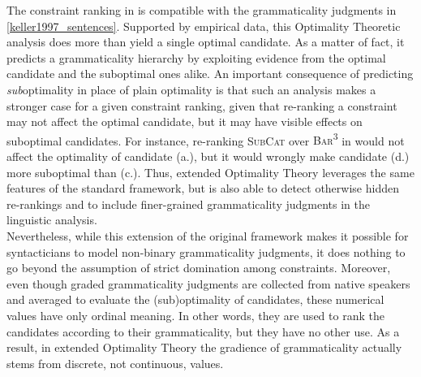 The constraint ranking in  is compatible with the grammaticality judgments in \ref{keller1997_sentences}. Supported by empirical data, this Optimality Theoretic analysis does more than yield a single optimal candidate. As a matter of fact, it predicts a grammaticality hierarchy by exploiting evidence from the optimal candidate and the suboptimal ones alike. An important consequence of predicting \textit{sub}optimality in place of plain optimality is that such an analysis makes a stronger case for a given constraint ranking, given that re-ranking a constraint may not affect the optimal candidate, but it may have visible effects on suboptimal candidates. For instance, re-ranking \textsc{SubCat} over \textsc{Bar\textsuperscript{3}} in  would not affect the optimality of candidate (a.), but it would wrongly make candidate (d.) more suboptimal than (c.). Thus, extended Optimality Theory leverages the same features of the standard framework, but is also able to detect otherwise hidden re-rankings and to include finer-grained grammaticality judgments in the linguistic analysis.\\
Nevertheless, while this extension of the original framework makes it possible for syntacticians to model non-binary grammaticality judgments, it does nothing to go beyond the assumption of strict domination among constraints. Moreover, even though graded grammaticality judgments are collected from native speakers and averaged to evaluate the (sub)optimality of candidates, these numerical values have only ordinal meaning. In other words, they are used to rank the candidates according to their grammaticality, but they have no other use. As a result, in extended Optimality Theory the gradience of grammaticality actually stems from discrete, not continuous, values.

